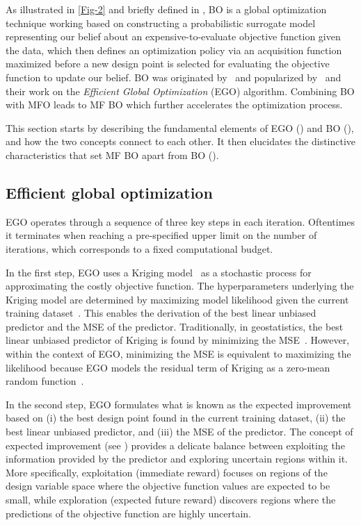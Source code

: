 \documentclass[iicol,sn-basic]{sn-jnl}%
\newcommand{\edit}[1]{\textcolor{red}{#1}} %
\begin{document}
As illustrated in \cref{Fig-2} and briefly defined in , BO is a global optimization technique working based on constructing a probabilistic surrogate model %
{representing our belief about an expensive-to-evaluate objective function given the data, which then defines an optimization policy via an acquisition function maximized} before a new design point is selected for evaluating the objective function %
{to update our belief}.
BO was originated by~\cite{Mockus1975} and popularized by~\cite{Jones1998} and their work on the \textit{Efficient Global Optimization} (EGO) algorithm.
Combining BO with MFO leads to MF BO which further accelerates the optimization process.
 
This section starts by describing the fundamental elements of EGO () and BO (), and how the two concepts connect to each other.
It then elucidates the distinctive characteristics that set MF BO apart from BO ().

\subsection{Efficient global optimization}\label{Sec31}

EGO operates through a sequence of three key steps in each iteration.
Oftentimes it terminates when reaching a pre-specified upper limit on the number of iterations,
which corresponds to a fixed computational budget. 

In the first step, EGO uses a Kriging model~\citep{Sacks1989,Chiles1999}
as a stochastic process for approximating the costly objective function.
The hyperparameters underlying the Kriging model are determined by maximizing
{model likelihood given} the current training dataset~\citep{Jones1998}.
This enables the derivation of the best linear unbiased predictor and the MSE of the predictor.
Traditionally, in geostatistics, the best linear unbiased predictor of Kriging is found by
minimizing the MSE~\citep{Sacks1989,Chiles1999,Kleijnen2009}. 
However, within the context of EGO, minimizing the MSE is equivalent to maximizing the likelihood
because EGO models the residual term of Kriging as a zero-mean random function~\citep{Jones1998}.

In the second step, EGO formulates what is known as the expected improvement based on (i) the best design point found in the current training dataset, (ii) the best linear unbiased predictor, and (iii) the MSE of the predictor.
The concept of expected improvement (see ) provides a delicate balance between exploiting the information provided by the predictor and exploring uncertain regions within it.
{More specifically, exploitation (immediate reward) focuses on regions of the design variable space where the objective function values are expected to be small, while exploration (expected future reward) discovers regions where the predictions of the objective function are highly uncertain.} 
\end{document}
